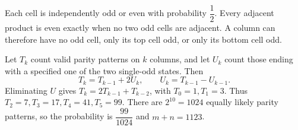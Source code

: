 Each cell is independently odd or even with probability $\dfrac{1}{2}$. Every adjacent product is even exactly when no two odd cells are adjacent. A column can therefore have no odd cell, only its top cell odd, or only its bottom cell odd.

Let $T_k$ count valid parity patterns on $k$ columns, and let $U_k$ count those ending with a specified one of the two single-odd states. Then
\[
T_k=T_{k-1}+2U_k,\qquad U_k=T_{k-1}-U_{k-1}.
\]
Eliminating $U$ gives $T_k=2T_{k-1}+T_{k-2}$, with $T_0=1,T_1=3$. Thus $T_2=7,T_3=17,T_4=41,T_5=99$. There are $2^{10}=1024$ equally likely parity patterns, so the probability is $\dfrac{99}{1024}$ and $\boxed{m+n=1123}$.

